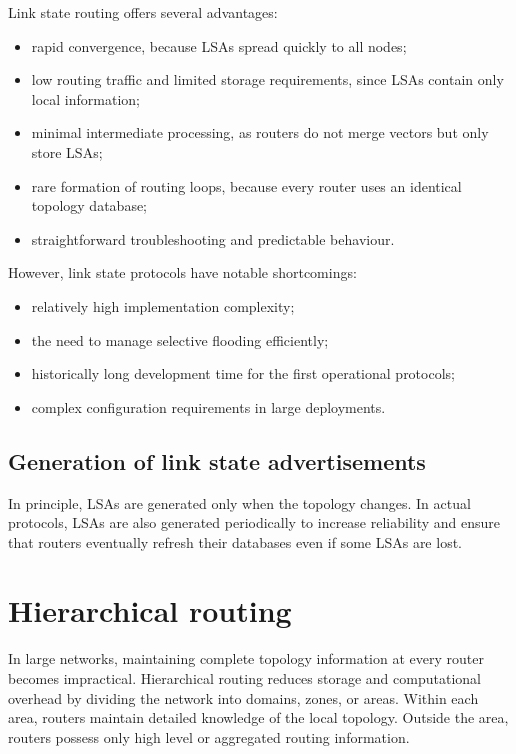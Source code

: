 \documentclass[11pt,a4paper,openany]{report}
\begin{document}
Link state routing offers several advantages:

\begin{itemize}
\item rapid convergence, because LSAs spread quickly to all nodes;
\item low routing traffic and limited storage requirements, since LSAs contain only local information;
\item minimal intermediate processing, as routers do not merge vectors but only store LSAs;
\item rare formation of routing loops, because every router uses an identical topology database;
\item straightforward troubleshooting and predictable behaviour.
\end{itemize}

However, link state protocols have notable shortcomings:

\begin{itemize}
\item relatively high implementation complexity;
\item the need to manage selective flooding efficiently;
\item historically long development time for the first operational protocols;
\item complex configuration requirements in large deployments.
\end{itemize}

\subsection{Generation of link state advertisements}

In principle, LSAs are generated only when the topology changes. In actual protocols, LSAs are also generated periodically to increase reliability and ensure that routers eventually refresh their databases even if some LSAs are lost.




\section{Hierarchical routing}

In large networks, maintaining complete topology information at every router becomes impractical. Hierarchical routing reduces storage and computational overhead by dividing the network into domains, zones, or areas. Within each area, routers maintain detailed knowledge of the local topology. Outside the area, routers possess only high level or aggregated routing information.
\end{document}
